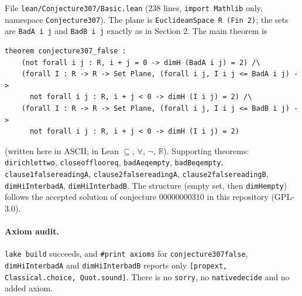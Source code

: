 \documentclass[11pt]{article}
\theoremstyle{definition}
\theoremstyle{remark}
\renewcommand{\_}{\oldus\allowbreak}
\begin{document}
File \texttt{lean/Conjecture307/Basic.lean} (238 lines, \texttt{import Mathlib} only, namespace
\texttt{Conjecture307}). The plane is \texttt{EuclideanSpace R (Fin 2)}; the sets are \texttt{BadA i j} and
\texttt{BadB i j} exactly as in Section 2. The main theorem is
\begin{verbatim}
theorem conjecture307_false :
    (not forall i j : R, i + j = 0 -> dimH (BadA i j) = 2) /\
    (forall I : R -> R -> Set Plane, (forall i j, I i j <= BadA i j) ->
      not forall i j : R, i + j < 0 -> dimH (I i j) = 2) /\
    (forall I : R -> R -> Set Plane, (forall i j, I i j <= BadB i j) ->
      not forall i j : R, i + j < 0 -> dimH (I i j) = 2)
\end{verbatim}
(written here in ASCII; in Lean $\subseteq$, $\forall$, $\neg$, $\mathbb{R}$). Supporting theorems:
\texttt{dirichlet\_two}, \texttt{close\_of\_floor\_eq}, \texttt{badA\_eq\_empty}, \texttt{badB\_eq\_empty},
\texttt{clause1\_false\_readingA}, \texttt{clause2\_false\_readingA}, \texttt{clause2\_false\_readingB},
\texttt{dimH\_iInter\_badA}, \texttt{dimH\_iInter\_badB}. The structure (empty set, then \texttt{dimH\_empty})
follows the accepted solution of conjecture 00000000310 in this repository (GPL-3.0).

\paragraph{Axiom audit.} \texttt{lake build} succeeds, and \texttt{\#print axioms} for
\texttt{conjecture307\_false}, \texttt{dimH\_iInter\_badA} and \texttt{dimH\_iInter\_badB} reports only
\texttt{[propext, Classical.choice, Quot.sound]}. There is no \texttt{sorry}, no \texttt{native\_decide} and no
added axiom.
\end{document}
